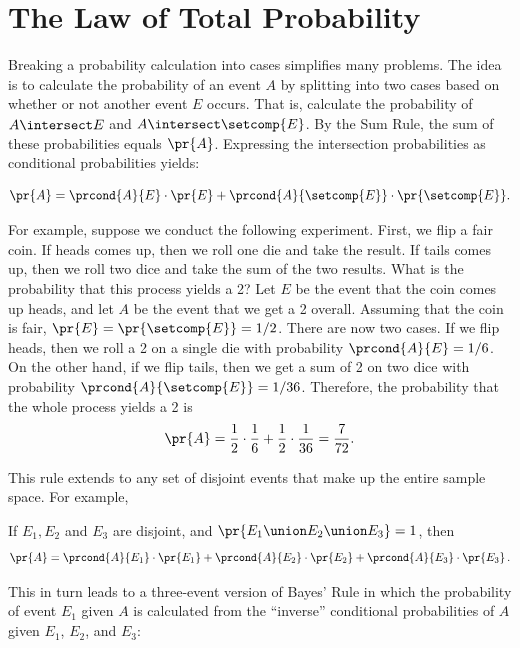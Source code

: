 
\begin{problems}
\homeworkproblems
{}
\end{problems}

\section{The Law of Total Probability}\label{sec:total_probability}

Breaking a probability calculation into cases simplifies many
problems.  The idea is to calculate the probability of an event $A$ by
splitting into two cases based on whether or not another event $E$
occurs.  That is, calculate the probability of $A\nobreak
\intersect\nobreak E$ and $A \intersect \setcomp{E}$.  By the Sum
Rule, the sum of these probabilities equals $\pr{A}$.  Expressing the
intersection probabilities as conditional probabilities yields:
\begin{rul}\label{total_prob_Ebar}
\[
\pr{A} = \prcond{A}{E} \cdot \pr{E} +
         \prcond{A}{\setcomp{E}} \cdot \pr{\setcomp{E}}.
\]
\end{rul}

For example, suppose we conduct the following experiment.  First, we
flip a fair coin.  If heads comes up, then we roll one die and take the
result.  If tails comes up, then we roll two dice and take the sum of
the two results.  What is the probability that this process yields a
2?  Let $E$ be the event that the coin comes up heads, and let $A$ be
the event that we get a 2 overall.  Assuming that the coin is fair,
$\pr{E} = \pr{\setcomp{E}} = 1/2$.  There are now two cases. If we
flip heads, then we roll a 2 on a single die with probability
$\prcond{A}{E} = 1/6$.  On the other hand, if we flip tails, then we
get a sum of 2 on two dice with probability
$\prcond{A}{\setcomp{E}} = 1/36$.  Therefore, the probability that
the whole process yields a 2 is
\[
\pr{A} = \frac{1}{2} \cdot \frac{1}{6} + \frac{1}{2} \cdot \frac{1}{36} =
  \frac{7}{72}.
\]

This rule extends to any set of disjoint events that make up the
entire sample space.  For example,
\begin{rul*}
If $E_1, E_2$ and $E_3$ are disjoint, and
$\pr{E_1 \union E_2 \union E_3} = 1$, then
\[
\pr{A} = \prcond{A}{E_1} \cdot \pr{E_1} + \prcond{A}{E_2} \cdot
\pr{E_2} + \prcond{A}{E_3} \cdot \pr{E_3}\,.
\]
\end{rul*}
This in turn leads to a three-event version of Bayes' Rule in which
the probability of event $E_1$ given $A$ is calculated from the
``inverse'' conditional probabilities of $A$ given $E_1$, $E_2$, and
$E_3$:

